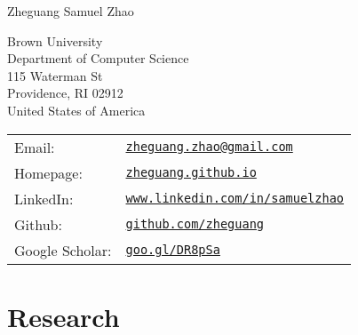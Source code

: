 \documentclass[letterpaper]{article}
\def\name{Zheguang Samuel Zhao}
\begin{document}
{\huge \name}


\vspace{0.25in}

\begin{minipage}{0.45\linewidth}
  Brown University \\
  Department of Computer Science \\
  115 Waterman St \\
  Providence, RI 02912 \\
  United States of America
\end{minipage}
\begin{minipage}{0.45\linewidth}
  \begin{tabular}{ll}
    Email: & \href{mailto:zheguang.zhao@gmail.com}{\tt zheguang.zhao@gmail.com} \\
    Homepage: & \href{https://zheguang.github.io}{\tt zheguang.github.io} \\
    LinkedIn: & \href{https://www.linkedin.com/in/samuelzhao}{\tt www.linkedin.com/in/samuelzhao} \\
    Github: & \href{https://github.com/zheguang}{\tt github.com/zheguang} \\
    Google Scholar: & \href{https://goo.gl/DR8pSa}{\tt goo.gl/DR8pSa} \\
  \end{tabular}
\end{minipage}


\section*{Research}

\end{document}
